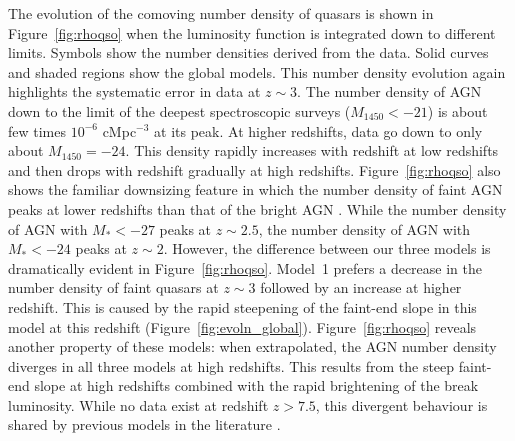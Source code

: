 \documentclass[fleqn,usenatbib]{mnras}
\newcommand{\new}[1]{{\color{notecolor} #1}}
\begin{document}
The evolution of the comoving number density of quasars is shown in
Figure~\ref{fig:rhoqso} when the luminosity function is integrated
down to different limits.  \new{Symbols show the number densities
  derived from the data.}  Solid curves and shaded regions show the
global models.  This number density evolution again highlights the
systematic error in data at $z\sim 3$.  \new{The number density of AGN
  down to the limit of the deepest spectroscopic surveys
  ($M_{1450}<-21$) is about few times $10^{-6}$ cMpc$^{-3}$ at its
  peak.  At higher redshifts, data go down to only about
  $M_{1450}=-24$.} This density rapidly increases with redshift at low
redshifts and then drops with redshift gradually at high redshifts.
Figure~\ref{fig:rhoqso} also shows the familiar downsizing feature in
which the number density of faint AGN peaks at lower redshifts than
that of the bright AGN \citep{2004ApJ...605..625H,
  2005MNRAS.360L..39N, 2006AJ....131.2766R, 2006A&A...451..443M,
  2009A&A...493...55E, 2013A&A...558A..89K, 2010MNRAS.401.2531A,
  2015MNRAS.451.1892A}.  While the number density of AGN with
$M_*<-27$ peaks at $z\sim 2.5$, the number density of AGN with
$M_*<-24$ peaks at $z\sim 2$.  However, the difference between our
three models is dramatically evident in Figure~\ref{fig:rhoqso}.
Model~1 prefers a decrease in the number density of faint quasars at
$z\sim 3$ followed by an increase at higher redshift.  This is caused
by the rapid steepening of the faint-end slope in this model at this
redshift (Figure~\ref{fig:evoln_global}).  Figure~\ref{fig:rhoqso}
reveals another property of these models: when extrapolated, the AGN
number density diverges in all three models at high redshifts.  This
results from the steep faint-end slope at high redshifts combined with
the rapid brightening of the break luminosity.  While no data exist at
redshift $z>7.5$, this divergent behaviour is shared by previous
models in the literature \citep{2007ApJ...654..731H}.
\end{document}
